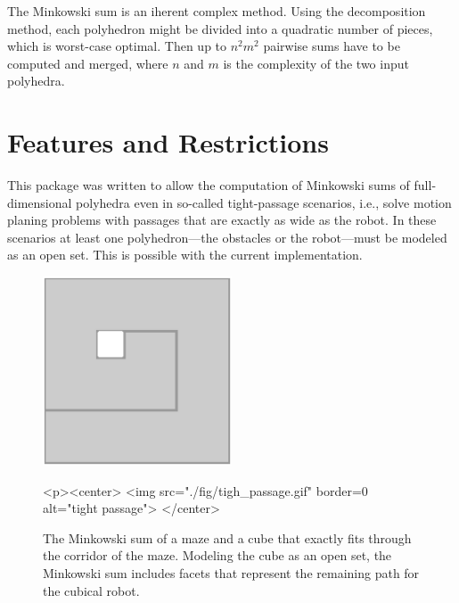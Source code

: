 The Minkowski sum is an iherent complex method. Using the
decomposition method, each polyhedron might be divided into a
quadratic number of pieces, which is worst-case optimal. Then up to
$n^2m^2$ pairwise sums have to be computed and merged, where $n$ and
$m$ is the complexity of the two input polyhedra.

\section{Features and Restrictions}

This package was written to allow the computation of Minkowski sums of
full-dimensional polyhedra even in so-called tight-passage scenarios,
i.e., solve motion planing problems with passages that are exactly as
wide as the robot. In these scenarios at least one polyhedron---the
obstacles or the robot---must be modeled as an open set. This is
possible with the current implementation.

\begin{figure}
  \begin{ccTexOnly}
    \begin{center}
      \includegraphics[width=0.5\textwidth]{Minkowski_sum_3/fig/tight_passage}
    \end{center}
  \end{ccTexOnly}
  \begin{ccHtmlOnly}
    <p><center>
    <img src="./fig/tigh_passage.gif" border=0 alt="tight passage">
    </center>
  \end{ccHtmlOnly}
  \caption{The Minkowski sum of a maze and a cube that exactly fits through
	   the corridor of the maze. Modeling the cube as an open set, the
	   Minkowski sum includes facets that represent the remaining path
           for the cubical robot.}
\end{figure}

